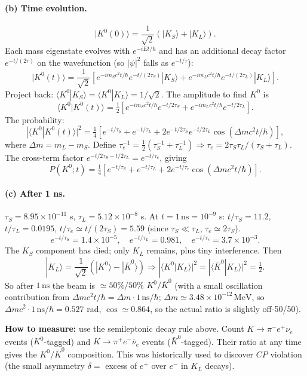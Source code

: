 \documentclass[11pt]{article}
\newcommand{\MeV}{\,\mathrm{MeV}}
\begin{document}
\paragraph{(b) Time evolution.}
\[
|K^0(0)\rangle=\frac{1}{\sqrt{2}}\!\left(|K_S\rangle+|K_L\rangle\right).
\]
Each mass eigenstate evolves with $e^{-iEt/\hbar}$ and has an additional decay factor $e^{-t/(2\tau)}$ on the wavefunction (so $|\psi|^{2}$ falls as $e^{-t/\tau}$):
\[
|K^0(t)\rangle=\frac{1}{\sqrt{2}}\!\left[e^{-im_S c^{2}t/\hbar}e^{-t/(2\tau_S)}|K_S\rangle+e^{-im_L c^{2}t/\hbar}e^{-t/(2\tau_L)}|K_L\rangle\right].
\]
Project back: $\langle K^0|K_S\rangle=\langle K^0|K_L\rangle=1/\sqrt{2}$. The amplitude to find $K^0$ is
\[
\langle K^0|K^0(t)\rangle=\tfrac{1}{2}\!\left[e^{-im_S c^{2}t/\hbar}e^{-t/2\tau_S}+e^{-im_L c^{2}t/\hbar}e^{-t/2\tau_L}\right].
\]
The probability:
\[
|\langle K^0|K^0(t)\rangle|^{2}=\tfrac{1}{4}\!\left[e^{-t/\tau_S}+e^{-t/\tau_L}+2 e^{-t/2\tau_S}e^{-t/2\tau_L}\cos(\Delta m c^{2}t/\hbar)\right],
\]
where $\Delta m=m_L-m_S$. Define $\tau_e^{-1}=\tfrac12(\tau_S^{-1}+\tau_L^{-1})\Rightarrow\tau_e=2\tau_S\tau_L/(\tau_S+\tau_L)$. The cross-term factor $e^{-t/2\tau_S-t/2\tau_L}=e^{-t/\tau_e}$, giving
\[
\boxed{\;P(K^0;t)=\tfrac14\!\left[e^{-t/\tau_S}+e^{-t/\tau_L}+2 e^{-t/\tau_e}\cos(\Delta m c^{2}t/\hbar)\right].\;}
\]

\paragraph{(c) After 1 ns.} $\tau_S=8.95\times 10^{-11}$ s, $\tau_L=5.12\times 10^{-8}$ s. At $t=1\,\mathrm{ns}=10^{-9}$ s:
$t/\tau_S=11.2$, $t/\tau_L=0.0195$, $t/\tau_e\simeq t/(2\tau_S)=5.59$ (since $\tau_S\ll\tau_L$, $\tau_e\simeq 2\tau_S$).
\[
e^{-t/\tau_S}=1.4\times 10^{-5},\quad e^{-t/\tau_L}=0.981,\quad e^{-t/\tau_e}=3.7\times 10^{-3}.
\]
The $K_S$ component has died; only $K_L$ remains, plus tiny interference. Then
\[
|K_L\rangle=\frac{1}{\sqrt{2}}(|K^0\rangle-|\bar K^0\rangle)\Rightarrow|\langle K^0|K_L\rangle|^{2}=|\langle\bar K^0|K_L\rangle|^{2}=\tfrac12.
\]
So after $1\,\mathrm{ns}$ the beam is $\simeq 50\%/50\%$ $K^0/\bar K^0$ (with a small oscillation contribution from $\Delta m c^{2}t/\hbar=\Delta m\cdot 1\,\mathrm{ns}/\hbar$; $\Delta m\simeq 3.48\times 10^{-12}\MeV$, so $\Delta m c^{2}\cdot 1\,\mathrm{ns}/\hbar=0.527$ rad, $\cos\simeq 0.864$, so the actual ratio is slightly off-50/50).

\textbf{How to measure:} use the semileptonic decay rule above. Count $K\to\pi^- e^+\nu_e$ events ($K^0$-tagged) and $K\to\pi^+ e^-\bar\nu_e$ events ($\bar K^0$-tagged). Their ratio at any time gives the $K^0/\bar K^0$ composition. This was historically used to discover $CP$ violation (the small asymmetry $\delta=$ excess of $e^+$ over $e^-$ in $K_L$ decays).
\end{document}
